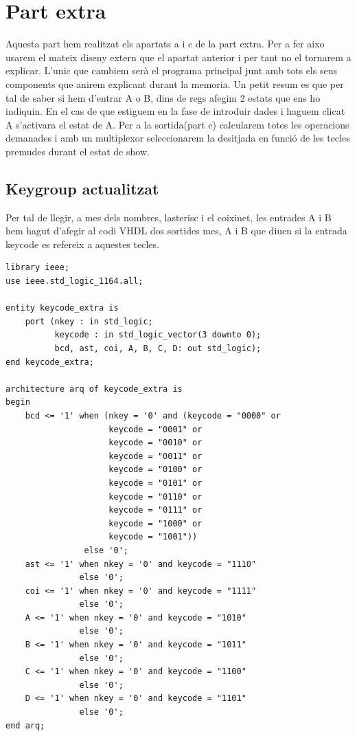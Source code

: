 \documentclass[12pt, a4papre]{article}
\begin{document}
	\newpage
	
	\section{Part extra}
	
	Aquesta part hem realitzat els apartats a i c de la part extra. Per a fer aixo usarem el mateix diseny extern que el apartat anterior i per tant no el tornarem a explicar. L'unic que cambiem serà el programa principal junt amb tots els seus components que anirem explicant durant la memoria. Un petit resum es que per tal de saber si hem d'entrar A o B, dins de regs afegim 2 estats que ens ho indiquin. En el cas de que estiguem en la fase de introduir dades i haguem clicat A s'activara el estat de A. Per a la sortida(part c) calcularem totes les operacions demanades i amb un multiplexor seleccionarem la desitjada en funció de les tecles premudes durant el estat de show.
	
	\subsection{Keygroup actualitzat}
	
	Per tal de llegir, a mes dels nombres, lasterisc i el coixinet, les entrades A i B hem hagut d'afegir al codi VHDL dos sortides mes, A i B que diuen si la entrada keycode es refereix a aquestes tecles.
	\begin{lstlisting}[style=vhdl, frame=single, basicstyle=\tiny]
library ieee;
use ieee.std_logic_1164.all;

entity keycode_extra is
	port (nkey : in std_logic;
		  keycode : in std_logic_vector(3 downto 0);
		  bcd, ast, coi, A, B, C, D: out std_logic);
end keycode_extra;

architecture arq of keycode_extra is
begin
	bcd <= '1' when (nkey = '0' and (keycode = "0000" or
					 keycode = "0001" or
					 keycode = "0010" or
					 keycode = "0011" or
					 keycode = "0100" or
					 keycode = "0101" or
					 keycode = "0110" or
					 keycode = "0111" or
					 keycode = "1000" or
					 keycode = "1001"))
				else '0';
	ast <= '1' when nkey = '0' and keycode = "1110"
			   else '0';
	coi <= '1' when nkey = '0' and keycode = "1111"
			   else '0';
	A <= '1' when nkey = '0' and keycode = "1010"
			   else '0';
	B <= '1' when nkey = '0' and keycode = "1011"
			   else '0';
	C <= '1' when nkey = '0' and keycode = "1100"
			   else '0';
	D <= '1' when nkey = '0' and keycode = "1101"
			   else '0';
end arq;
\end{lstlisting}
	
\end{document}
